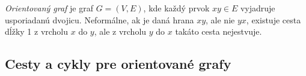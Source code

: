 \textit{Orientovaný graf} je graf $G = (V, E)$, kde každý prvok $xy \in E$ vyjadruje usporiadanú dvojicu. Neformálne, ak je daná hrana $xy$, ale nie $yx$, existuje cesta dĺžky 1 z vrcholu $x$ do $y$, ale z vrcholu $y$ do $x$ takáto cesta nejestvuje.\newline

\subsection{Cesty a cykly pre orientované grafy}
